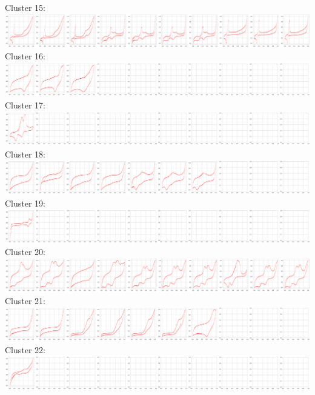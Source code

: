 Cluster 15:\\
\includegraphics[width=1.0\textwidth]{figures/clusters/cv_cluster15.png}
Cluster 16:\\
\includegraphics[width=1.0\textwidth]{figures/clusters/cv_cluster16.png}
Cluster 17:\\
\includegraphics[width=1.0\textwidth]{figures/clusters/cv_cluster17.png}
Cluster 18:\\
\includegraphics[width=1.0\textwidth]{figures/clusters/cv_cluster18.png}
Cluster 19:\\
\includegraphics[width=1.0\textwidth]{figures/clusters/cv_cluster19.png}
Cluster 20:\\
\includegraphics[width=1.0\textwidth]{figures/clusters/cv_cluster20.png}
Cluster 21:\\
\includegraphics[width=1.0\textwidth]{figures/clusters/cv_cluster21.png}
Cluster 22:\\
\includegraphics[width=1.0\textwidth]{figures/clusters/cv_cluster22.png}
